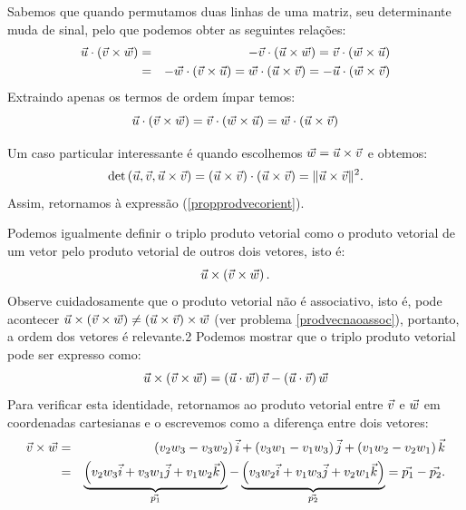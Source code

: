 Sabemos que quando permutamos duas linhas de uma matriz, seu determinante muda de sinal, pelo que podemos obter as seguintes relações:
\begin{eqnarray*}
\vec{u}\cdot\left(\vec{v}\times\vec{w}\right)&=&-\vec{v}\cdot\left(\vec{u}\times\vec{w}\right)=\vec{v}\cdot\left(\vec{w}\times\vec{u}\right)\\
&=&-\vec{w}\cdot\left(\vec{v}\times\vec{u}\right)=\vec{w}\cdot\left(\vec{u}\times\vec{v}\right)=-\vec{u}\cdot\left(\vec{w}\times\vec{v}\right)  
\end{eqnarray*}
Extraindo apenas os termos de ordem ímpar temos:
\begin{equation}\label{triploprodutoescalar} \vec{u}\cdot\left(\vec{v}\times\vec{w}\right)=\vec{v}\cdot\left(\vec{w}\times\vec{u}\right)=\vec{w}\cdot\left(\vec{u}\times\vec{v}\right)
\end{equation}
\begin{obs} Um caso particular interessante é quando escolhemos $\vec{w}=\vec{u}\times\vec{v}$ e obtemos:
\begin{equation*} 
\det\left(\vec{u},\vec{v},\vec{u}\times\vec{v}\right)=\left(\vec{u}\times\vec{v}\right)\cdot\left(\vec{u}\times\vec{v}\right)=\|\vec{u}\times\vec{v}\|^2.
\end{equation*}
Assim, retornamos à expressão (\ref{propprodvecorient}).
\end{obs}

Podemos igualmente definir o triplo produto vetorial como o produto vetorial de um vetor pelo produto vetorial de outros dois vetores, isto é:
$$\vec{u}\times \left(\vec{v}\times\vec{w}\right). $$
Observe cuidadosamente que o produto vetorial não é associativo, isto é, pode acontecer $\vec{u}\times \left(\vec{v}\times\vec{w}\right)\neq \left(\vec{u}\times \vec{v}\right)\times\vec{w} $ (ver problema \ref{prodvecnaoassoc}), portanto, a ordem dos vetores é relevante.2
Podemos mostrar que o triplo produto vetorial pode ser expresso como:
\begin{equation*} 
\vec{u}\times\left(\vec{v}\times\vec{w}\right)=\left(\vec{u}\cdot\vec{w}\right)\vec{v}-\left(\vec{u}\cdot\vec{v}\right)\vec{w}
\end{equation*}
Para verificar esta identidade, retornamos ao produto vetorial entre $\vec{v}$ e $\vec{w}$ em coordenadas cartesianas e o escrevemos como a diferença entre dois vetores:
\begin{eqnarray*} \vec{v}\times\vec{w}&=&\left(v_2w_3-v_3w_2\right)\vec{i}+\left(v_3w_1-v_1w_3\right)\vec{j}+\left(v_1w_2-v_2w_1\right)\vec{k}\\
&=& \underbrace{\left(v_2w_3\vec{i}+v_3w_1\vec{j}+v_1w_2\vec{k}\right)}_{\vec{p_1}} -\underbrace{\left(v_3w_2\vec{i}+v_1w_3\vec{j}+v_2w_1\vec{k}\right)}_{\vec{p_2}}=\vec{p_1}-\vec{p_2}.
\end{eqnarray*}



